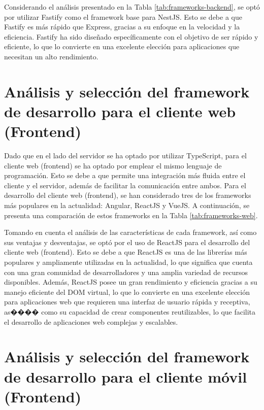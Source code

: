 

Considerando el análisis presentado en la Tabla \ref{tab:frameworks-backend}, se optó por utilizar Fastify como
el framework base para NestJS. Esto se debe a que Fastify es más rápido que Express, gracias a su enfoque en la
velocidad y la eficiencia. Fastify ha sido diseñado específicamente con el objetivo de ser rápido y eficiente,
lo que lo convierte en una excelente elección para aplicaciones que necesitan un alto rendimiento.

\section{Análisis y selección del framework de desarrollo para el cliente web (Frontend)}

Dado que en el lado del servidor se ha optado por utilizar TypeScript, para el cliente web (frontend) se ha optado
por emplear el mismo lenguaje de programación. Esto se debe a que permite una integración más fluida entre el
cliente y el servidor, además de facilitar la comunicación entre ambos. Para el desarrollo del cliente web
(frontend), se han considerado tres de los frameworks más populares en la actualidad: Angular, ReactJS y VueJS.
A continuación, se presenta una comparación de estos frameworks en la Tabla \ref{tab:frameworks-web}.






Tomando en cuenta el análisis de las características de cada framework, así como sus ventajas y desventajas, se
optó por el uso de ReactJS para el desarrollo del cliente web (frontend). Esto se debe a que ReactJS es una de
las librerías más populares y ampliamente utilizadas en la actualidad, lo que significa que cuenta con una gran
comunidad de desarrolladores y una amplia variedad de recursos disponibles. Además, ReactJS posee un gran
rendimiento y eficiencia gracias a su manejo eficiente del DOM virtual, lo que lo convierte en una excelente
elección para aplicaciones web que requieren una interfaz de usuario rápida y receptiva, as���� como su capacidad
de crear componentes reutilizables, lo que facilita el desarrollo de aplicaciones web complejas y escalables.

\section{Análisis y selección del framework de desarrollo para el cliente móvil (Frontend)}


